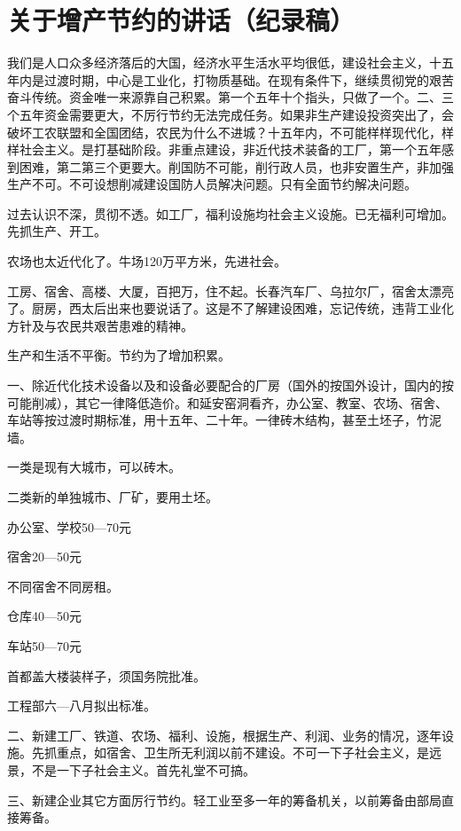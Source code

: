 \section[关于增产节约的讲话（纪录稿）（一九五五年）]{关于增产节约的讲话（纪录稿）}


我们是人口众多经济落后的大国，经济水平生活水平均很低，建设社会主义，十五年内是过渡时期，中心是工业化，打物质基础。在现有条件下，继续贯彻党的艰苦奋斗传统。资金唯一来源靠自己积累。第一个五年十个指头，只做了一个。二、三个五年资金需要更大，不厉行节约无法完成任务。如果非生产建设投资突出了，会破坏工农联盟和全国团结，农民为什么不进城？十五年内，不可能样样现代化，样样社会主义。是打基础阶段。非重点建设，非近代技术装备的工厂，第一个五年感到困难，第二第三个更要大。削国防不可能，削行政人员，也非安置生产，非加强生产不可。不可设想削减建设国防人员解决问题。只有全面节约解决问题。

过去认识不深，贯彻不透。如工厂，福利设施均社会主义设施。已无福利可增加。先抓生产、开工。

农场也太近代化了。牛场120万平方米，先进社会。

工房、宿舍、高楼、大厦，百把万，住不起。长春汽车厂、乌拉尔厂，宿舍太漂亮了。厨房，西太后出来也要说话了。这是不了解建设困难，忘记传统，违背工业化方针及与农民共艰苦患难的精神。

生产和生活不平衡。节约为了增加积累。

一、除近代化技术设备以及和设备必要配合的厂房（国外的按国外设计，国内的按可能削减），其它一律降低造价。和延安窑洞看齐，办公室、教室、农场、宿舍、车站等按过渡时期标准，用十五年、二十年。一律砖木结构，甚至土坯子，竹泥墙。

一类是现有大城市，可以砖木。

二类新的单独城市、厂矿，要用土坯。

办公室、学校50—70元

宿舍20—50元

不同宿舍不同房租。

仓库40—50元

车站50—70元

首都盖大楼装样子，须国务院批准。

工程部六—八月拟出标准。

二、新建工厂、铁道、农场、福利、设施，根据生产、利润、业务的情况，逐年设施。先抓重点，如宿舍、卫生所无利润以前不建设。不可一下子社会主义，是远景，不是一下子社会主义。首先礼堂不可搞。

三、新建企业其它方面厉行节约。轻工业至多一年的筹备机关，以前筹备由部局直接筹备。

